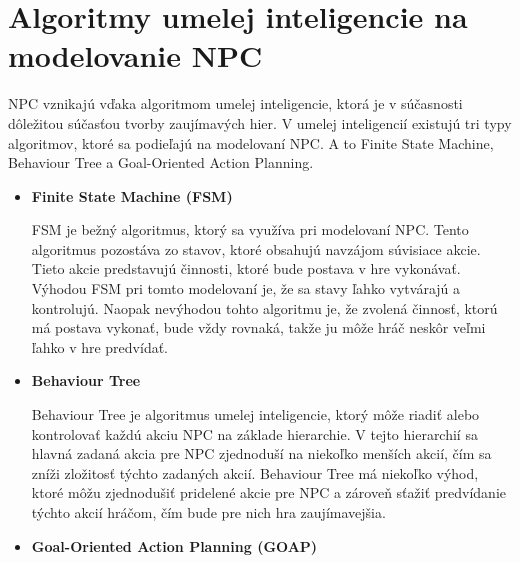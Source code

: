 \documentclass[10pt,twoside,slovak,a4paper]{article}
\begin{document}
\section{Algoritmy umelej inteligencie na modelovanie NPC} 
\quad NPC vznikajú vďaka algoritmom umelej inteligencie, ktorá je v súčasnosti dôležitou súčasťou tvorby zaujímavých hier. V umelej inteligencií existujú tri typy algoritmov, ktoré sa podieľajú na modelovaní NPC. A to Finite State Machine, Behaviour Tree a Goal-Oriented Action Planning.  
\begin{itemize}
\item \textbf{Finite State Machine (FSM)}

\quad FSM je bežný algoritmus, ktorý sa využíva pri modelovaní NPC. Tento algoritmus pozostáva zo stavov, ktoré obsahujú navzájom súvisiace akcie. Tieto akcie predstavujú činnosti, ktoré bude postava v hre vykonávať. Výhodou FSM pri tomto modelovaní je, že sa stavy ľahko vytvárajú a kontrolujú. Naopak nevýhodou tohto algoritmu je, že zvolená činnosť, ktorú má postava vykonať, bude vždy rovnaká, takže ju môže hráč neskôr veľmi ľahko v hre predvídať. \cite{NPC}


\item \textbf{Behaviour Tree}

\quad Behaviour Tree je algoritmus umelej inteligencie, ktorý môže riadiť alebo kontrolovať každú akciu NPC na základe hierarchie. V tejto hierarchií sa hlavná zadaná akcia pre NPC zjednoduší na niekoľko menších akcií, čím sa zníži zložitosť týchto zadaných akcií. Behaviour Tree má niekoľko výhod, ktoré môžu zjednodušiť pridelené akcie pre NPC a zároveň sťažiť predvídanie týchto akcií hráčom, čím bude pre nich hra zaujímavejšia.   \cite{NPC}

\item \textbf{Goal-Oriented Action Planning (GOAP)}


\end{itemize}
\end{document}
